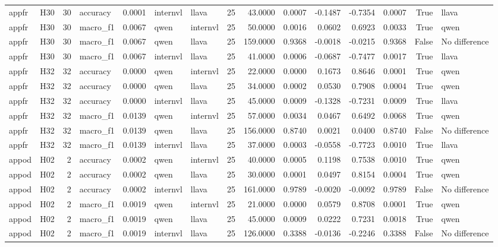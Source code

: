 \begin{table}[tbp]
\begin{tabular}{llrlrllrrrrrrrl}
appfr & H30 & 30 & accuracy & 0.0001 & internvl & llava & 25 & 43.0000 & 0.0007 & -0.1487 & -0.7354 & 0.0007 & True & llava \\
appfr & H30 & 30 & macro\_f1 & 0.0067 & qwen & internvl & 25 & 50.0000 & 0.0016 & 0.0602 & 0.6923 & 0.0033 & True & qwen \\
appfr & H30 & 30 & macro\_f1 & 0.0067 & qwen & llava & 25 & 159.0000 & 0.9368 & -0.0018 & -0.0215 & 0.9368 & False & No difference \\
appfr & H30 & 30 & macro\_f1 & 0.0067 & internvl & llava & 25 & 41.0000 & 0.0006 & -0.0687 & -0.7477 & 0.0017 & True & llava \\
appfr & H32 & 32 & accuracy & 0.0000 & qwen & internvl & 25 & 22.0000 & 0.0000 & 0.1673 & 0.8646 & 0.0001 & True & qwen \\
appfr & H32 & 32 & accuracy & 0.0000 & qwen & llava & 25 & 34.0000 & 0.0002 & 0.0530 & 0.7908 & 0.0004 & True & qwen \\
appfr & H32 & 32 & accuracy & 0.0000 & internvl & llava & 25 & 45.0000 & 0.0009 & -0.1328 & -0.7231 & 0.0009 & True & llava \\
appfr & H32 & 32 & macro\_f1 & 0.0139 & qwen & internvl & 25 & 57.0000 & 0.0034 & 0.0467 & 0.6492 & 0.0068 & True & qwen \\
appfr & H32 & 32 & macro\_f1 & 0.0139 & qwen & llava & 25 & 156.0000 & 0.8740 & 0.0021 & 0.0400 & 0.8740 & False & No difference \\
appfr & H32 & 32 & macro\_f1 & 0.0139 & internvl & llava & 25 & 37.0000 & 0.0003 & -0.0558 & -0.7723 & 0.0010 & True & llava \\
appod & H02 & 2 & accuracy & 0.0002 & qwen & internvl & 25 & 40.0000 & 0.0005 & 0.1198 & 0.7538 & 0.0010 & True & qwen \\
appod & H02 & 2 & accuracy & 0.0002 & qwen & llava & 25 & 30.0000 & 0.0001 & 0.0497 & 0.8154 & 0.0004 & True & qwen \\
appod & H02 & 2 & accuracy & 0.0002 & internvl & llava & 25 & 161.0000 & 0.9789 & -0.0020 & -0.0092 & 0.9789 & False & No difference \\
appod & H02 & 2 & macro\_f1 & 0.0019 & qwen & internvl & 25 & 21.0000 & 0.0000 & 0.0579 & 0.8708 & 0.0001 & True & qwen \\
appod & H02 & 2 & macro\_f1 & 0.0019 & qwen & llava & 25 & 45.0000 & 0.0009 & 0.0222 & 0.7231 & 0.0018 & True & qwen \\
appod & H02 & 2 & macro\_f1 & 0.0019 & internvl & llava & 25 & 126.0000 & 0.3388 & -0.0136 & -0.2246 & 0.3388 & False & No difference \\

\end{tabular}
\end{table}
